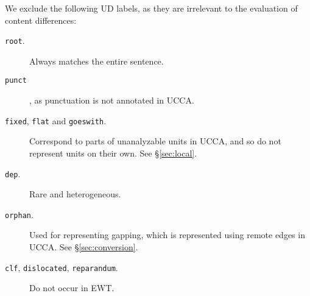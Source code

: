 \documentclass[11pt,a4paper]{article}
\begin{document}
We exclude the following UD labels,
as they are irrelevant to the evaluation of content differences:

\begin{description}
  \item[\texttt{root}.] Always matches the entire sentence.
  \item[\texttt{punct}], as punctuation is not annotated in UCCA.
  \item[\texttt{fixed}, \texttt{flat} and \texttt{goeswith}.] Correspond to parts of unanalyzable units in UCCA,
    and so do not represent units on their own. See \S\ref{sec:local}.
  \item[\texttt{dep}.] Rare and heterogeneous.
  \item[\texttt{orphan}.] Used for representing gapping, which is represented using remote edges in UCCA. See \S\ref{sec:conversion}.
  \item[\texttt{clf}, \texttt{dislocated}, \texttt{reparandum}.] Do not occur in EWT.
\end{description}
\end{document}
